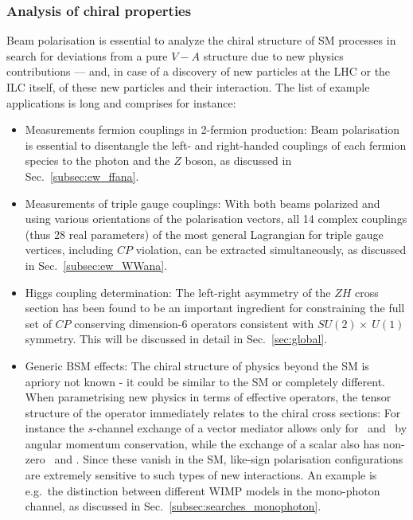 \subsubsection{Analysis of chiral properties} 
\label{subsubsec:pol:chiral}
Beam polarisation is essential to analyze the chiral structure of SM processes in search for deviations from a pure $V-A$ structure due to new physics contributions --- and, in case of a discovery of new particles at the LHC or the ILC itself, of these new particles and their interaction. The list of example applications is long and comprises for instance:
\begin{itemize}
\item Measurements fermion couplings in 2-fermion production: Beam polarisation is essential to disentangle the left- and right-handed couplings of each fermion species to the photon and the $Z$ boson, as discussed in Sec.~\ref{subsec:ew_ffana}. 
\item Measurements of triple gauge couplings: With both beams polarized and using various orientations of the polarisation vectors, all 14 complex couplings (thus 28 real parameters) of the most general Lagrangian for triple gauge vertices, including $CP$ violation, can be extracted simultaneously, as  discussed in Sec.~\ref{subsec:ew_WWana}.
\item Higgs coupling determination: The left-right asymmetry of the $ZH$ cross section has been found to be an important ingredient for constraining the full set of $CP$ conserving dimension-6 operators consistent with $SU(2) \times\ U(1)$ symmetry. This will be discussed in detail in Sec.~\ref{sec:global}.
\item Generic BSM effects: The chiral structure of physics beyond the SM is apriory not known - it could be similar to the SM or completely different. When parametrising new physics in terms of effective operators, the tensor structure of the operator immediately relates to the chiral cross sections: For instance the $s$-channel exchange of a vector mediator allows only for \sigmaLR\ and \sigmaRL\ by angular momentum conservation,
while the exchange of a scalar also has non-zero \sigmaLL\ and \sigmaRR. Since these
vanish in the SM, like-sign polarisation configurations are extremely sensitive to 
such types of new interactions. An example is e.g.\ the distinction between different WIMP models in the mono-photon channel, as discussed in Sec.~\ref{subsec:searches_monophoton}.
\end{itemize}  


